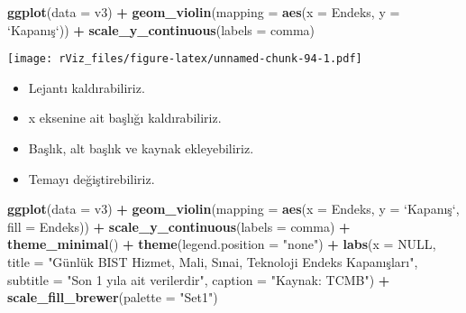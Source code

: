 \documentclass[
]{book}
\newenvironment{Shaded}{\begin{snugshade}}{\end{snugshade}}
\newcommand{\DataTypeTok}[1]{\textcolor[rgb]{0.13,0.29,0.53}{#1}}
\newcommand{\KeywordTok}[1]{\textcolor[rgb]{0.13,0.29,0.53}{\textbf{#1}}}
\newcommand{\NormalTok}[1]{#1}
\newcommand{\OperatorTok}[1]{\textcolor[rgb]{0.81,0.36,0.00}{\textbf{#1}}}
\newcommand{\OtherTok}[1]{\textcolor[rgb]{0.56,0.35,0.01}{#1}}
\newcommand{\StringTok}[1]{\textcolor[rgb]{0.31,0.60,0.02}{#1}}
\begin{document}
\begin{Shaded}
\begin{Highlighting}[]
\KeywordTok{ggplot}\NormalTok{(}\DataTypeTok{data =}\NormalTok{ v3) }\OperatorTok{+}
\StringTok{  }\KeywordTok{geom_violin}\NormalTok{(}\DataTypeTok{mapping =} \KeywordTok{aes}\NormalTok{(}\DataTypeTok{x =}\NormalTok{ Endeks, }\DataTypeTok{y =} \StringTok{`}\DataTypeTok{Kapanış}\StringTok{`}\NormalTok{)) }\OperatorTok{+}
\StringTok{  }\KeywordTok{scale_y_continuous}\NormalTok{(}\DataTypeTok{labels =}\NormalTok{ comma)}
\end{Highlighting}
\end{Shaded}

\texttt{[image: rViz\_files/figure-latex/unnamed-chunk-94-1.pdf]}

\begin{itemize}
\item
  Lejantı kaldırabiliriz.
\item
  x eksenine ait başlığı kaldırabiliriz.
\item
  Başlık, alt başlık ve kaynak ekleyebiliriz.
\item
  Temayı değiştirebiliriz.
\end{itemize}

\begin{Shaded}
\begin{Highlighting}[]
\KeywordTok{ggplot}\NormalTok{(}\DataTypeTok{data =}\NormalTok{ v3) }\OperatorTok{+}
\StringTok{  }\KeywordTok{geom_violin}\NormalTok{(}\DataTypeTok{mapping =} \KeywordTok{aes}\NormalTok{(}\DataTypeTok{x =}\NormalTok{ Endeks, }\DataTypeTok{y =} \StringTok{`}\DataTypeTok{Kapanış}\StringTok{`}\NormalTok{, }\DataTypeTok{fill =}\NormalTok{ Endeks)) }\OperatorTok{+}
\StringTok{  }\KeywordTok{scale_y_continuous}\NormalTok{(}\DataTypeTok{labels =}\NormalTok{ comma) }\OperatorTok{+}
\StringTok{  }\KeywordTok{theme_minimal}\NormalTok{() }\OperatorTok{+}
\StringTok{  }\KeywordTok{theme}\NormalTok{(}\DataTypeTok{legend.position =} \StringTok{"none"}\NormalTok{) }\OperatorTok{+}
\StringTok{  }\KeywordTok{labs}\NormalTok{(}\DataTypeTok{x =} \OtherTok{NULL}\NormalTok{,}
       \DataTypeTok{title =} \StringTok{"Günlük BIST Hizmet, Mali, Sınai, Teknoloji Endeks Kapanışları"}\NormalTok{,}
       \DataTypeTok{subtitle =} \StringTok{"Son 1 yıla ait verilerdir"}\NormalTok{,}
       \DataTypeTok{caption =} \StringTok{"Kaynak: TCMB"}\NormalTok{) }\OperatorTok{+}
\StringTok{  }\KeywordTok{scale_fill_brewer}\NormalTok{(}\DataTypeTok{palette =} \StringTok{"Set1"}\NormalTok{)}
\end{Highlighting}
\end{Shaded}
\end{document}
